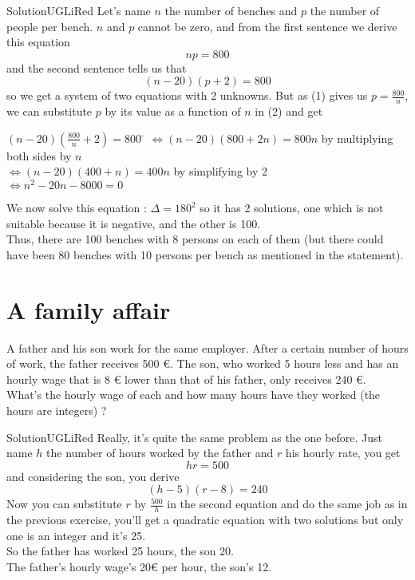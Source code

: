 \documentclass[12pt,a4paper,article,english,firamath]{nsi}
\begin{document}
\begin{encadrecolore}{Solution}{UGLiRed}
    Let's name $n$ the number of benches and $p$ the number of people per bench. $n$ and $p$ cannot be zero, and from the first sentence we derive this equation
    \begin{equation}
        np = 800
    \end{equation}
    and the second sentence tells us that
    \begin{equation}
        (n-20)(p+2) = 800
    \end{equation}
    so we get a system of two equations with 2 unknowns. But as (1) gives us $p = \frac{800}{n}$, we can substitute $p$ by its value as a function of $n$ in (2) and get
    \begin{tabbing}
        $ (n-20)\left(\frac{800}{n}+2\right)= 800 $ 	\= $\Leftrightarrow (n-20)\left(800+2n\right)= 800n $ by multiplying both sides by $n$ \\
        \>  $\Leftrightarrow (n-20)\left(400+n\right)= 400n $ by simplifying by 2 \\
        \>  $\Leftrightarrow n^2-20n-8000 = 0$ \\  
    \end{tabbing}
    We now solve this equation : $\Delta = 180^2$ so it has 2 solutions, one which is not suitable because it is negative, and the other is 100.\\

    Thus, there are 100 benches with 8 persons on each of them (but there could have been 80 benches with 10 persons per bench as mentioned in the statement).
\end{encadrecolore}

\section*{A family affair}
A father and his son work for the same employer. After a certain number of hours of work, the father receives 500 €. The son, who worked 5 hours less and has an hourly wage that is 8 € lower than that of his father, only receives 240 €. \\

What's the hourly wage of each and how many hours have they worked (the hours are integers) ?
\begin{encadrecolore}{Solution}{UGLiRed}
    Really, it's quite the same problem as the one before. Just name $h$ the number of hours worked by the father and $r$ his hourly rate, you get $$hr = 500$$ and considering the son, you derive $$(h-5)(r-8)=240$$
    Now you can substitute $r$ by $\frac{500}{h}$ in the second equation and do the same job as in the previous exercise, you'll get a quadratic equation with two solutions but only one is an integer and it's 25.\\
    So the father has worked 25 hours, the son 20.\\
    The father's hourly wage's 20€ per hour, the son's 12.
\end{encadrecolore}
\end{document}
